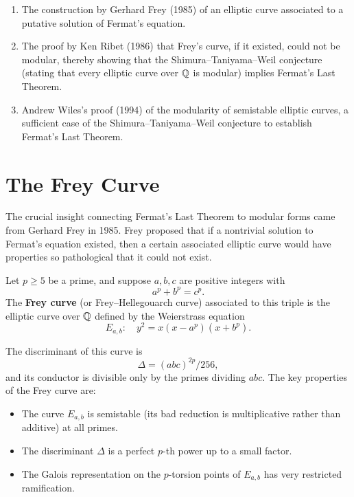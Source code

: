 \begin{enumerate}
    \item The construction by Gerhard Frey (1985) of an elliptic curve associated to a putative solution of Fermat's equation.
    \item The proof by Ken Ribet (1986) that Frey's curve, if it existed, could not be modular, thereby showing that the Shimura--Taniyama--Weil conjecture (stating that every elliptic curve over \(\mathbb{Q}\) is modular) implies Fermat's Last Theorem.
    \item Andrew Wiles's proof (1994) of the modularity of semistable elliptic curves, a sufficient case of the Shimura--Taniyama--Weil conjecture to establish Fermat's Last Theorem.
\end{enumerate}

\section{The Frey Curve}

The crucial insight connecting Fermat's Last Theorem to modular forms came from Gerhard Frey in 1985. Frey proposed that if a nontrivial solution to Fermat's equation existed, then a certain associated elliptic curve would have properties so pathological that it could not exist.

\begin{definition}
Let \(p \geq 5\) be a prime, and suppose \(a, b, c\) are positive integers with
\[
a^p + b^p = c^p.
\]
The \textbf{Frey curve} (or Frey--Hellegouarch curve) associated to this triple is the elliptic curve over \(\mathbb{Q}\) defined by the Weierstrass equation
\[
E_{a,b}: \quad y^2 = x(x - a^p)(x + b^p).
\]
\end{definition}

The discriminant of this curve is
\[
\Delta = (abc)^{2p} / 256,
\]
and its conductor is divisible only by the primes dividing \(abc\). The key properties of the Frey curve are:

\begin{itemize}
    \item The curve \(E_{a,b}\) is semistable (its bad reduction is multiplicative rather than additive) at all primes.
    \item The discriminant \(\Delta\) is a perfect \(p\)-th power up to a small factor.
    \item The Galois representation on the \(p\)-torsion points of \(E_{a,b}\) has very restricted ramification.
\end{itemize}

